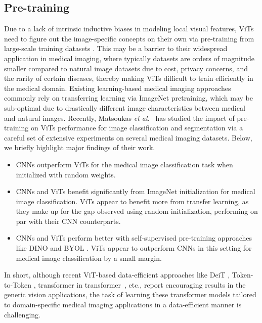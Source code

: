 \documentclass[10pt,journal,compsoc]{IEEEtran}
\begin{document}
\subsection{Pre-training} \label{sec:pretraining}


Due to a lack of intrinsic inductive biases in modeling local visual features, ViTs need to figure out the image-specific concepts on their own via pre-training from large-scale training datasets \cite{dosovitskiy2020image}. This may be a barrier to their widespread application in medical imaging, where typically datasets are orders of magnitude smaller compared to natural image datasets due to cost, privacy concerns, and the rarity of certain diseases, thereby making ViTs difficult to train efficiently in the medical domain. {Existing learning-based medical imaging approaches commonly rely on transferring learning via ImageNet
pretraining, which may be sub-optimal due to drastically different image characteristics between medical and natural images.}
Recently, Matsoukas \textit{et al.}~\cite{matsoukas2021time} has studied the impact of pre-training on ViTs performance for image classification and segmentation via a careful set of extensive experiments on several medical imaging datasets. Below, we briefly highlight major findings of their work. %
\begin{itemize}
\item CNNs outperform ViTs for the medical image classification task when initialized with random weights.
\item CNNs and ViTs benefit significantly from ImageNet initialization for medical image classification. ViTs appear to benefit more from transfer learning, as they make up for the gap observed using random initialization, performing on par with their CNN counterparts.
\item CNNs and ViTs perform better with self-supervised pre-training approaches like DINO \cite{caron2021emerging} and BYOL \cite{grill2020bootstrap}. ViTs appear to outperform CNNs in this setting for medical image classification by a small margin.

\end{itemize}
In short, although recent ViT-based data-efficient approaches like DeiT \cite{touvron2021training}, Token-to-Token \cite{yuan2021tokens}, transformer in transformer~\cite{han2021transformer}, etc., report encouraging results in the generic vision applications, the task of learning these transformer models tailored to domain-specific medical imaging applications in a data-efficient manner is challenging. 
\end{document}
